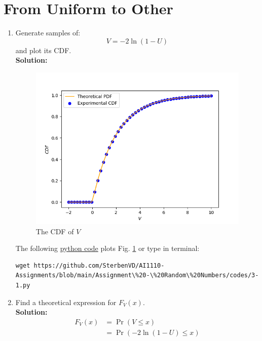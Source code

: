 \documentclass[journal,12pt,twocolumn]{IEEEtran}
\numberwithin{equation}{section}
\renewcommand\thesection{\arabic{section}}
\providecommand{\pr}[1]{\ensuremath{\Pr\left(#1\right)}}
\providecommand{\brak}[1]{\ensuremath{\left(#1\right)}}
\providecommand{\gitlink}[2]{{\color{blue}\href{https://github.com/SterbenVD/AI1110-Assignments/blob/main/Assignment\%20-\%20Random\%20Numbers/#1}{#2}}}
\newcommand{\solution}{\noindent \textbf{\\ Solution: }}
\begin{document}
\section{From Uniform to Other}
\begin{enumerate}[label=\thesection.\arabic*,ref=\thesection.\theenumi]
    \item
          Generate samples of:
          \begin{equation}
              V = -2\ln\brak{1-U}
          \end{equation}
          and plot its CDF.
          \solution
          \begin{figure}[H]
              \centering
              \includegraphics[width = \columnwidth]{../figs/3_cdf}
              \caption{The CDF of $V$}
              \label{fig:3_cdf}
          \end{figure}
          The following \gitlink{codes/3-1.py}{python code} plots Fig. \ref{fig:3_cdf} or type in terminal:
          \begin{lstlisting}
wget https://github.com/SterbenVD/AI1110-Assignments/blob/main/Assignment\%20-\%20Random\%20Numbers/codes/3-1.py
            \end{lstlisting}
    \item Find a theoretical expression for $F_V(x)$.
          \solution
          \begin{align}
              F_V(x) & = \pr{V \leq x}                                        \\
                     & = \pr{-2\ln(1-U) \leq x}                               \\

\end{align}
\end{enumerate}
\end{document}
